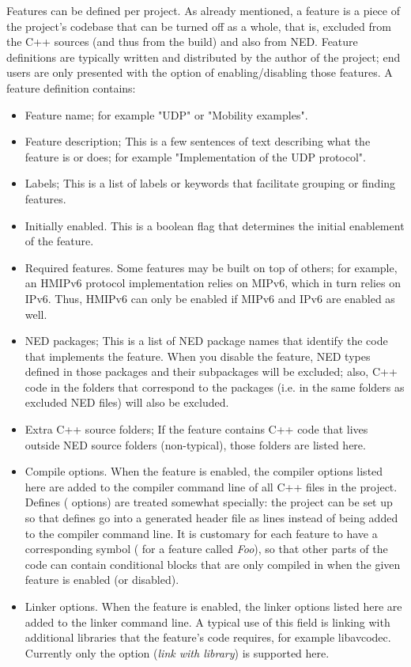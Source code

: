 Features can be defined per project. As already mentioned, a feature is a piece of the
project's codebase that can be turned off as a whole, that is, excluded from the C++ sources
(and thus from the build) and also from NED. Feature definitions are typically written
and distributed by the author of the project; end users are only presented with the
option of enabling/disabling those features. A feature definition contains:

\begin{itemize}
  \item Feature name; for example "UDP" or "Mobility examples".
  \item Feature description; This is a few sentences of text describing what the feature
    is or does; for example "Implementation of the UDP protocol".
  \item Labels; This is a list of labels or keywords that facilitate grouping or finding features.
  \item Initially enabled. This is a boolean flag that determines the initial enablement
    of the feature.
\item Required features. Some features may be built on top of others; for example, an HMIPv6
    protocol implementation relies on MIPv6, which in turn relies on IPv6. Thus, HMIPv6 can
    only be enabled if MIPv6 and IPv6 are enabled as well.
\item NED packages; This is a list of NED package names that identify the code that implements
    the feature. When you disable the feature, NED types defined in those packages and their
    subpackages will be excluded; also, C++ code in the folders that correspond to the packages
    (i.e. in the same folders as excluded NED files) will also be excluded.
\item Extra C++ source folders; If the feature contains C++ code that lives outside NED source
    folders (non-typical), those folders are listed here.
\item Compile options. When the feature is enabled, the compiler options listed
    here are added to the compiler command line of all C++ files in the project.
    Defines ( options) are treated somewhat specially: the project can
    be set up so that defines go into a generated header file as 
    lines instead of being added to the compiler command line. It is
    customary for each feature to have a corresponding symbol
    ( for a feature called \textit{Foo}), so that other parts of
    the code can contain conditional blocks that are only compiled in when the
    given feature is enabled (or disabled). 
\item Linker options. When the feature is enabled, the linker options listed here are added
    to the linker command line. A typical use of this field is linking with additional
    libraries that the feature's code requires, for example libavcodec.
    Currently only the  option (\textit{link with library}) is supported here.
\end{itemize}


